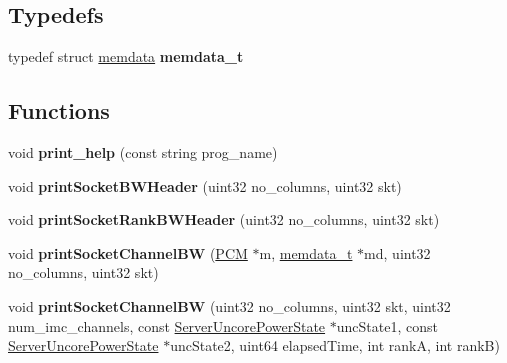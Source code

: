 \subsection*{Typedefs}
\begin{DoxyCompactItemize}
\item 
\mbox{\label{pcm-memory_8cpp_a2bf815f628bb420ad49e0b50bd6ebd8d}} 
typedef struct \mbox{\hyperlink{structmemdata}{memdata}} {\bfseries memdata\+\_\+t}
\end{DoxyCompactItemize}
\subsection*{Functions}
\begin{DoxyCompactItemize}
\item 
\mbox{\label{pcm-memory_8cpp_aed15bac2c898efcc1f005764539f7970}} 
void {\bfseries print\+\_\+help} (const string prog\+\_\+name)
\item 
\mbox{\label{pcm-memory_8cpp_a962949c6d7e9f9fd0e4773274c902e5b}} 
void {\bfseries print\+Socket\+B\+W\+Header} (uint32 no\+\_\+columns, uint32 skt)
\item 
\mbox{\label{pcm-memory_8cpp_a64347d4f792e8aa01f984c6205cfdb23}} 
void {\bfseries print\+Socket\+Rank\+B\+W\+Header} (uint32 no\+\_\+columns, uint32 skt)
\item 
\mbox{\label{pcm-memory_8cpp_a09e2c1ff17631406288026d7114b8e9f}} 
void {\bfseries print\+Socket\+Channel\+BW} (\mbox{\hyperlink{class_p_c_m}{P\+CM}} $\ast$m, \mbox{\hyperlink{structmemdata}{memdata\+\_\+t}} $\ast$md, uint32 no\+\_\+columns, uint32 skt)
\item 
\mbox{\label{pcm-memory_8cpp_ae714d368c0d95745ce56581cb195e466}} 
void {\bfseries print\+Socket\+Channel\+BW} (uint32 no\+\_\+columns, uint32 skt, uint32 num\+\_\+imc\+\_\+channels, const \mbox{\hyperlink{class_server_uncore_power_state}{Server\+Uncore\+Power\+State}} $\ast$unc\+State1, const \mbox{\hyperlink{class_server_uncore_power_state}{Server\+Uncore\+Power\+State}} $\ast$unc\+State2, uint64 elapsed\+Time, int rankA, int rankB)
\item 
\mbox{\label{pcm-memory_8cpp_abbc24d2d54513a1943bd4cf37c829efc}} 

\end{DoxyCompactItemize}
